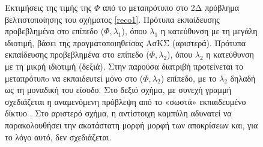 \begin{figure}[h!]
\begin{minipage}[b]{0.5\linewidth}
 \centering
\end{minipage}
\begin{minipage}[b]{0.5\linewidth}
 \centering
\end{minipage}
\caption{Εκτιμήσεις της τιμής της $\Phi$ από το μεταπρότυπο στο 2Δ πρόβλημα βελτιστοποίησης του σχήματος \ref{reco1}.  Πρότυπα εκπαίδευσης προβεβλημένα στο επίπεδο ($\Phi,\lambda_1$), όπου $\lambda_1$ η κατεύθυνση με τη μεγάλη ιδιοτιμή, βάσει της πραγματοποιηθείσας ΑσΚΣ (αριστερά). Πρότυπα εκπαίδευσης προβεβλημένα στο επίπεδο ($\Phi,\lambda_2$), όπου $\lambda_2$ η κατεύθυνση με τη μικρή ιδιοτιμή (δεξιά). Στην παρούσα διατριβή προτείνεται το μεταπρότυπo να εκπαιδευτεί μόνο στο  ($\Phi,\lambda_2$) επίπεδο, με το $\lambda_2$ δηλαδή ως τη μοναδική του είσοδο. Στο δεξιό σχήμα, με συνεχή γραμμή σχεδιάζεται η αναμενόμενη πρόβλεψη από το «σωστά» εκπαιδευμένο δίκτυο . Στο αριστερό σχήμα, η αντίστοιχη καμπύλη αδυνατεί να παρακολουθήσει την ακατάστατη μορφή μορφή των αποκρίσεων και, για το λόγο αυτό, δεν σχεδιάζεται.} 
\label{1dann}
\end{figure}

